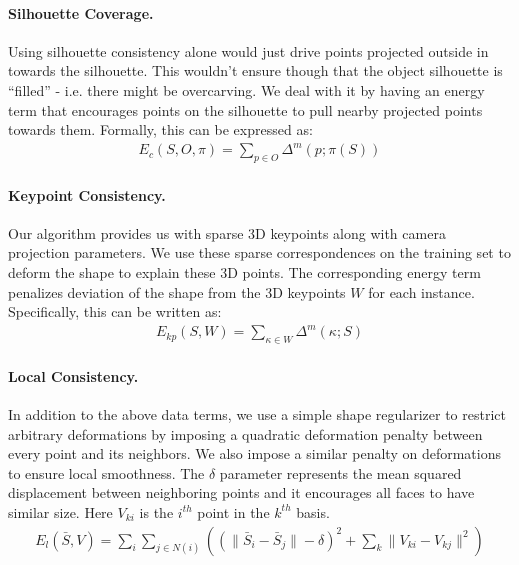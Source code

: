 \paragraph{Silhouette Coverage.}
Using silhouette consistency alone would just drive points projected outside in towards the silhouette. This wouldn't ensure though that the object silhouette is ``filled'' - i.e. there might be overcarving. We deal with it by having an energy term that encourages points on the silhouette to pull nearby projected points towards them. Formally, this can be expressed as:
\begin{gather}
    \label{eq:sil_cov}E_{c}(S,O,\pi)=\underset{p\in O}{\sum}\Delta^m(p;\pi(S))
\end{gather}


\paragraph{Keypoint Consistency.} Our \nrsfm algorithm provides us with sparse 3D keypoints along with camera projection parameters. We use these sparse correspondences on the training set to deform the shape to explain these 3D points. The corresponding energy term penalizes deviation of the shape from the 3D keypoints $W$ for each instance. Specifically, this can be written as:
\begin{gather}
    \label{eq:kpgrad}E_{kp}(S,W)=\underset{\kappa\in W}{\sum}\Delta^m(\kappa;S)
\end{gather}


\paragraph{Local Consistency.} In addition to the above data terms, we use a simple shape regularizer to restrict arbitrary deformations by imposing a quadratic deformation penalty between every point and its neighbors. We also impose a similar penalty on deformations to ensure local smoothness. The $\delta$ parameter represents the mean squared displacement between neighboring points and it encourages all faces to have similar size. Here $V_{ki}$ is the $i^{th}$ point in the $k^{th}$ basis.
\begin{gather}
 \label{eq:local_con}E_{l}(\bar{S},V)=\underset{i}{\sum}\underset{j\in N(i)}{\sum}((\|\bar{S}_{i}-\bar{S}_{j}\| - \delta)^2 + \underset{k}{\sum}\|V_{ki}-V_{kj}\|^2)
 \end{gather}
 

